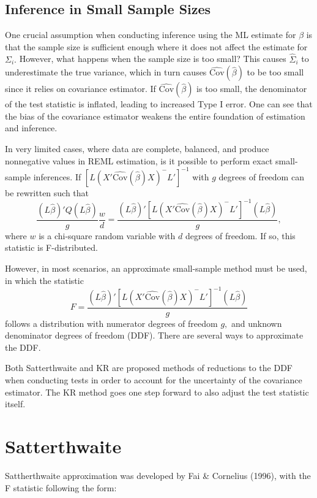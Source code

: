 \documentclass[12pt, twoside]{amherstthesis}
\begin{document}
\hypertarget{inference-in-small-sample-sizes}{%
\subsection{Inference in Small Sample Sizes}\label{inference-in-small-sample-sizes}}

One crucial assumption when conducting inference using the ML estimate for \(\beta\) is that the sample size is sufficient enough where it does not affect the estimate for \(\Sigma_i.\) However, what happens when the sample size is too small? This causes \(\hat\Sigma_i\) to underestimate the true variance, which in turn causes \(\widehat {\text{Cov}}(\hat\beta)\) to be too small since it relies on covariance estimator. If \(\widehat {\text{Cov}}(\hat\beta)\) is too small, the denominator of the test statistic is inflated, leading to increased Type I error. One can see that the bias of the covariance estimator weakens the entire foundation of estimation and inference.

In very limited cases, where data are complete, balanced, and produce nonnegative values in REML estimation, is it possible to perform exact small-sample inferences. If \([L(X'\widehat {\text{Cov}}(\hat\beta)X)^-L']^{-1}\) with \(g\) degrees of freedom can be rewritten such that \[ \frac{(L\hat\beta)'Q(L\hat\beta)}{g}\frac{w}{d} =  \frac{(L\hat\beta)'[L(X'\widehat {\text{Cov}}(\hat\beta)X)^-L']^{-1}(L\hat\beta)}{g},\] where \(w\) is a chi-square random variable with \(d\) degrees of freedom. If so, this statistic is F-distributed.

However, in most scenarios, an approximate small-sample method must be used, in which the statistic \[F = \frac{(L\hat\beta)'[L(X'\widehat {\text{Cov}}(\hat\beta)X)^-L']^{-1}(L\hat\beta)}{g}\] follows a distribution with numerator degrees of freedom \(g,\) and unknown denominator degrees of freedom (DDF). There are several ways to approximate the DDF.

Both Satterthwaite and KR are proposed methods of reductions to the DDF when conducting tests in order to account for the uncertainty of the covariance estimator. The KR method goes one step forward to also adjust the test statistic itself.

\hypertarget{satterthwaite}{%
\section{Satterthwaite}\label{satterthwaite}}

Sattherthwaite approximation was developed by Fai \& Cornelius (1996), with the F statistic following the form:
\end{document}
